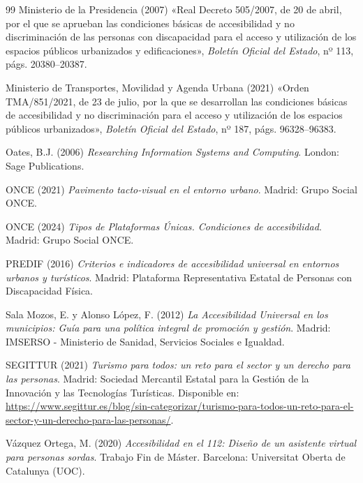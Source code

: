 \begin{thebibliography}{99}
Ministerio de la Presidencia (2007) 
«Real Decreto 505/2007, de 20 de abril, por el que se aprueban las condiciones básicas de accesibilidad y no discriminación de las personas con discapacidad para el acceso y utilización de los espacios públicos urbanizados y edificaciones», 
\textit{Boletín Oficial del Estado}, nº 113, págs. 20380--20387.

Ministerio de Transportes, Movilidad y Agenda Urbana (2021) 
«Orden TMA/851/2021, de 23 de julio, por la que se desarrollan las condiciones básicas de accesibilidad y no discriminación para el acceso y utilización de los espacios públicos urbanizados», 
\textit{Boletín Oficial del Estado}, nº 187, págs. 96328--96383.

Oates, B.J. (2006) 
\textit{Researching Information Systems and Computing}. 
London: Sage Publications.

ONCE (2021) 
\textit{Pavimento tacto-visual en el entorno urbano}. 
Madrid: Grupo Social ONCE.

ONCE (2024) 
\textit{Tipos de Plataformas Únicas. Condiciones de accesibilidad}. 
Madrid: Grupo Social ONCE.

PREDIF (2016) 
\textit{Criterios e indicadores de accesibilidad universal en entornos urbanos y turísticos}. 
Madrid: Plataforma Representativa Estatal de Personas con Discapacidad Física.

Sala Mozos, E. y Alonso López, F. (2012) 
\textit{La Accesibilidad Universal en los municipios: Guía para una política integral de promoción y gestión}. 
Madrid: IMSERSO - Ministerio de Sanidad, Servicios Sociales e Igualdad.

SEGITTUR (2021) 
\textit{Turismo para todos: un reto para el sector y un derecho para las personas}. 
Madrid: Sociedad Mercantil Estatal para la Gestión de la Innovación y las Tecnologías Turísticas. 
Disponible en: \url{https://www.segittur.es/blog/sin-categorizar/turismo-para-todos-un-reto-para-el-sector-y-un-derecho-para-las-personas/}.

Vázquez Ortega, M. (2020) 
\textit{Accesibilidad en el 112: Diseño de un asistente virtual para personas sordas}. 
Trabajo Fin de Máster. Barcelona: Universitat Oberta de Catalunya (UOC).

\end{thebibliography}